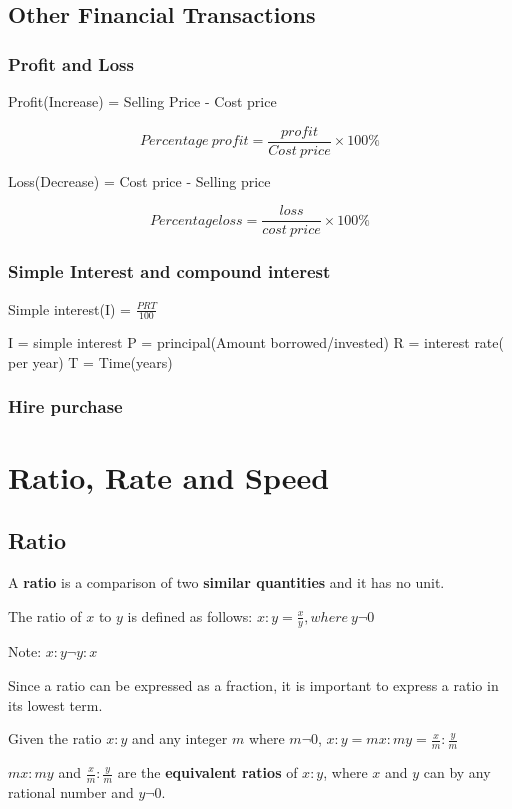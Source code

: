 \documentclass[../main]{subfiles}
\begin{document}
\subsection{Other Financial Transactions}
\subsubsection{Profit and Loss}

Profit(Increase) = Selling Price - Cost price

\[Percentage\ profit={\frac {profit} {Cost\ price}} \times 100\%\]

Loss(Decrease) = Cost price - Selling price

\[  Percentage loss = {\frac {loss} {cost\ price}} \times 100\%\]

\subsubsection{Simple Interest and compound interest}

Simple interest(I) = \({\frac {PRT} {100}}\)

I = simple interest
P = principal(Amount borrowed/invested)
R = interest rate( per year)
T = Time(years)

\subsubsection{Hire purchase}

\section{Ratio, Rate and Speed}
\subsection{Ratio}
A \textbf{ratio} is a comparison of two \textbf{similar quantities} and it has
no unit.

The ratio of $x$ to $y$ is defined as follows:
\(x:y={\frac x y}, where\ y \neg 0\)

Note: \(x:y \neg y:x\)

Since a ratio can be expressed as a fraction, it is important to express a ratio
in its lowest term.

Given the ratio \(x:y\) and any integer $m$ where \(m \neg 0\), \(x:y = mx:my =
{\frac x m}:{\frac y m}\)

\(mx:my\) and \({\frac x m}:{\frac y m}\) are the \textbf{equivalent ratios} of
\(x:y\), where $x$ and $y$ can by any rational number and \(y \neg 0\).
\end{document}
